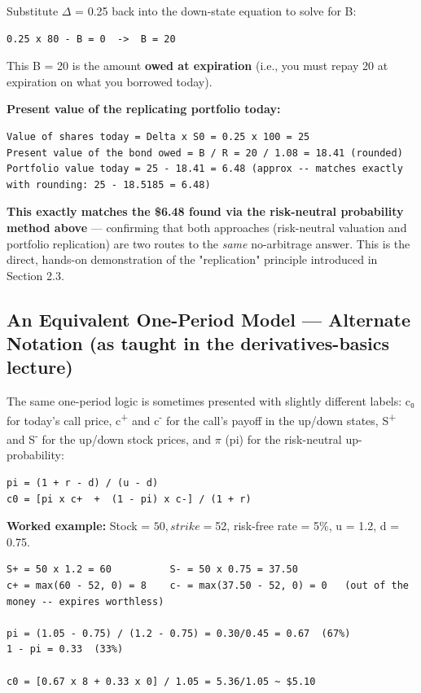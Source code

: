 \documentclass[12pt,openany]{book}
\theoremstyle{definition}
\theoremstyle{remark}
\begin{document}
Substitute \ensuremath{\Delta} = 0.25 back into the down-state equation to solve for B:
\begin{lstlisting}[style=notesCode]
0.25 x 80 - B = 0  ->  B = 20
\end{lstlisting}
This B = 20 is the amount \textbf{owed at expiration} (i.e., you must repay 20 at expiration on what you borrowed today).

\textbf{Present value of the replicating portfolio today:}
\begin{lstlisting}[style=notesCode]
Value of shares today = Delta x S0 = 0.25 x 100 = 25
Present value of the bond owed = B / R = 20 / 1.08 = 18.41 (rounded)
Portfolio value today = 25 - 18.41 = 6.48 (approx -- matches exactly with rounding: 25 - 18.5185 = 6.48)
\end{lstlisting}

\textbf{This exactly matches the \$6.48 found via the risk-neutral probability method above} — confirming that both approaches (risk-neutral valuation and portfolio replication) are two routes to the \emph{same} no-arbitrage answer. This is the direct, hands-on demonstration of the "replication" principle introduced in Section 2.3.

\subsection{An Equivalent One-Period Model — Alternate Notation (as taught in the derivatives-basics lecture)}

The same one-period logic is sometimes presented with slightly different labels: c₀ for today's call price, c\textsuperscript{+} and c\textsuperscript{-} for the call's payoff in the up/down states, S\textsuperscript{+} and S\textsuperscript{-} for the up/down stock prices, and \textbf{\ensuremath{\pi}} (pi) for the risk-neutral up-probability:

\begin{lstlisting}[style=notesCode]
pi = (1 + r - d) / (u - d)
c0 = [pi x c+  +  (1 - pi) x c-] / (1 + r)
\end{lstlisting}

\textbf{Worked example:} Stock = \(50, strike = \)52, risk-free rate = 5\%, u = 1.2, d = 0.75.

\begin{lstlisting}[style=notesCode]
S+ = 50 x 1.2 = 60          S- = 50 x 0.75 = 37.50
c+ = max(60 - 52, 0) = 8    c- = max(37.50 - 52, 0) = 0   (out of the money -- expires worthless)

pi = (1.05 - 0.75) / (1.2 - 0.75) = 0.30/0.45 = 0.67  (67%)
1 - pi = 0.33  (33%)

c0 = [0.67 x 8 + 0.33 x 0] / 1.05 = 5.36/1.05 ~ $5.10
\end{lstlisting}
\end{document}
